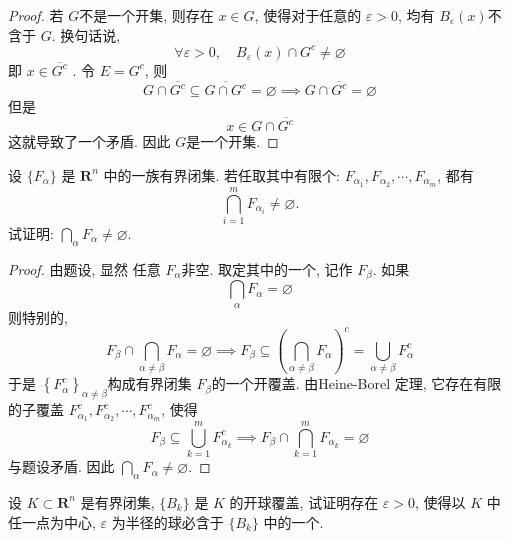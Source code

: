 \documentclass[../main.tex]{subfiles}
\begin{document}
\begin{proof}
    若 \(  G  \)不是一个开集, 则存在 \(  x \in G  \), 使得对于任意的 \(   \varepsilon > 0  \), 均有 \(  B_{ \varepsilon }\left( x \right)   \)不含于 \(  G  \). 换句话说,  \[
    \forall  \varepsilon > 0, \quad B_{ \varepsilon }\left( x \right)\cap G^{c}\neq \varnothing  
    \]即  \(  x \in  \overline{G^{c}}  \)    .  令 \(  E= G^c  \), 则 \[
    G\cap  \overline{G^{c}}\subseteq  \overline{G\cap G^{c}}=  \varnothing\implies  G\cap  \overline{G^{c}}= \varnothing
    \]    但是 \[
    x \in G\cap  \overline{G^{c}}
    \]这就导致了一个矛盾. 因此 \(  G  \)是一个开集. 
\end{proof}
\begin{exercise}{}{}
设 $\{F_\alpha\}$ 是 $\mathbf{R}^n$ 中的一族有界闭集. 若任取其中有限个: $F_{\alpha_1}, F_{\alpha_2}, \cdots, F_{\alpha_m}$, 都有
\[
\bigcap_{i=1}^m F_{\alpha_i} \neq \varnothing.
\]
试证明: $\bigcap_\alpha F_\alpha \neq \varnothing$.
\end{exercise}
\begin{proof}
    由题设, 显然 任意 \(  F_{\alpha }  \)非空. 取定其中的一个, 记作 \(  F_\beta   \). 如果 \[
    \bigcap _{\alpha }F_{\alpha }= \varnothing
    \]则特别的, \[
    F_{\beta }\cap \bigcap _{\alpha \neq \beta }F_{\alpha }= \varnothing\implies F_{\beta }\subseteq \left( \bigcap _{\alpha \neq \beta }F_{\alpha } \right)^{c}= \bigcup _{\alpha \neq \beta }F_{\alpha }^{c} 
    \]  于是 \(  \left\{ F_{\alpha }^{c} \right\}_{\alpha \neq \beta }  \)构成有界闭集 \(  F_{\beta }  \)的一个开覆盖. 由Heine-Borel 定理, 它存在有限的子覆盖 \(  F_{\alpha _1 }^{c},F_{\alpha _2 }^{c},\cdots ,F_{\alpha _{m}}^{c}  \), 使得 \[
    F_{\beta }\subseteq \bigcup _{k= 1}^{m}F_{\alpha _{k}}^{c}\implies F_{\beta }\cap \bigcap _{k= 1}^{m}F_{\alpha _{k}}= \varnothing
    \]   与题设矛盾. 因此 \(  \bigcap _{ \alpha }F_{\alpha }\neq \varnothing  \). 
\end{proof}
\begin{exercise}{}{}
设 $K \subset \mathbf{R}^n$ 是有界闭集, $\{B_k\}$ 是 $K$ 的开球覆盖, 试证明存在 $\varepsilon > 0$, 使得以 $K$ 中任一点为中心, $\varepsilon$ 为半径的球必含于 $\{B_k\}$ 中的一个.
\end{exercise}
\end{document}
